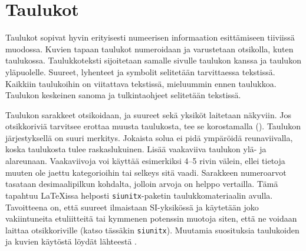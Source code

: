 \section{Taulukot}

Taulukot sopivat hyvin erityisesti numeerisen informaation esittämiseen tiiviissä muodossa. Kuvien tapaan taulukot numeroidaan ja varustetaan otsikolla, kuten taulukossa. Taulukkoteksti sijoitetaan samalle sivulle taulukon kanssa ja taulukon yläpuolelle. Suureet, lyhenteet ja symbolit selitetään tarvittaessa tekstissä. Kaikkiin taulukoihin on viitattava tekstissä, mieluummin ennen taulukkoa. Taulukon keskeinen sanoma ja tulkintaohjeet selitetään tekstissä.

Taulukon sarakkeet otsikoidaan, ja suureet sekä yksiköt laitetaan näkyviin. Jos otsikkoriviä tarvitsee erottaa muusta taulukosta, tee se korostamalla (). Taulukon järjestyksellä on suuri merkitys. Jokaista solua ei pidä ympäröidä reunaviivalla, koska taulukosta tulee raskaslukuinen. Lisää vaakaviiva taulukon ylä- ja alareunaan. Vaakaviivoja voi käyttää esimerkiksi 4--5 rivin välein, ellei tietoja muuten ole jaettu kategorioihin tai selkeys sitä vaadi. Sarakkeen numeroarvot tasataan desimaalipilkun kohdalta, jolloin arvoja on helppo vertailla. Tämä tapahtuu \LaTeX{}issa helposti \texttt{siunitx}-paketin \parencite{siunitx} taulukkomateriaalin avulla. Tavoitteena on, että suureet ilmaistaan SI-yksikössä ja käytetään joko vakiintuneita etuliitteitä tai kymmenen potenssin muotoja siten, että ne voidaan laittaa otsikkoriville (katso tässäkin \texttt{siunitx}). Muutamia suosituksia taulukoiden ja kuvien käytöstä löydät lähteestä \parencite{pubadvice2009}.

\begin{table}
\centering
\caption{Esimerkki höyrystysolosuhteista kahdessa ohutkalvorakenteessa.}
\label{tab:taulukkoesimerkki}
\end{table}

